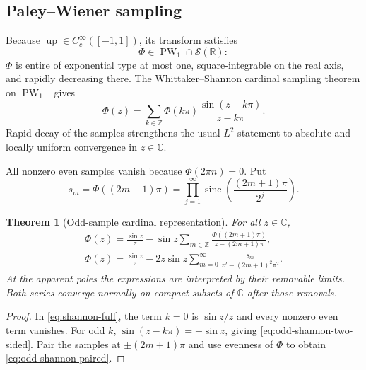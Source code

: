 \documentclass[11pt,oneside]{article}
\newtheorem{theorem}{Theorem}[section]
\theoremstyle{definition}
\theoremstyle{remark}
\newcommand{\R}{\mathbb R}
\newcommand{\C}{\mathbb C}
\newcommand{\Z}{\mathbb Z}
\newcommand{\Up}{\operatorname{up}}
\newcommand{\sinc}{\operatorname{sinc}}
\newcommand{\1}{\mathbf 1}
\newcommand{\PW}{\operatorname{PW}}
\begin{document}
\subsection{Paley--Wiener sampling}

Because $\Up\in C_c^\infty([-1,1])$, its transform satisfies
\begin{equation}
 \Phi\in\PW_1\cap\mathscr S(\R):                        \label{eq:Phi-PW}
\end{equation}
$\Phi$ is entire of exponential type at most one, square-integrable on the
real axis, and rapidly decreasing there.  The Whittaker--Shannon cardinal sampling theorem on
$\PW_1$~\cite{paleywiener1934,whittaker1935,shannon1949} gives
\begin{equation}
 \Phi(z)=\sum_{k\in\Z}\Phi(k\pi)
 \frac{\sin(z-k\pi)}{z-k\pi}.                            \label{eq:shannon-full}
\end{equation}
Rapid decay of the samples strengthens the usual $L^2$ statement to absolute
and locally uniform convergence in $z\in\C$.

All nonzero even samples vanish because $\Phi(2\pi n)=0$.  Put
\begin{equation}
 s_m=\Phi((2m+1)\pi)
 =\prod_{j=1}^\infty
   \sinc\!\left(\frac{(2m+1)\pi}{2^j}\right).           \label{eq:odd-samples}
\end{equation}

\begin{theorem}[Odd-sample cardinal representation]
\label{thm:odd-shannon}
For all $z\in\C$,
\begin{align}
 \boxed{\displaystyle
 \Phi(z)=\frac{\sin z}{z}
 -\sin z\sum_{m\in\Z}
 \frac{\Phi((2m+1)\pi)}{z-(2m+1)\pi},}                 \label{eq:odd-shannon-two-sided}\\
 \boxed{\displaystyle
 \Phi(z)=\frac{\sin z}{z}
 -2z\sin z\sum_{m=0}^\infty
 \frac{s_m}{z^2-(2m+1)^2\pi^2}.}                        \label{eq:odd-shannon-paired}
\end{align}
At the apparent poles the expressions are interpreted by their removable
limits.  Both series converge normally on compact subsets of $\C$ after those
removals.
\end{theorem}

\begin{proof}
In \eqref{eq:shannon-full}, the term $k=0$ is $\sin z/z$ and every nonzero
even term vanishes.  For odd $k$,
$\sin(z-k\pi)=-\sin z$, giving
\eqref{eq:odd-shannon-two-sided}.  Pair the samples at $\pm(2m+1)\pi$ and use
evenness of $\Phi$ to obtain \eqref{eq:odd-shannon-paired}.
\end{proof}
\end{document}
